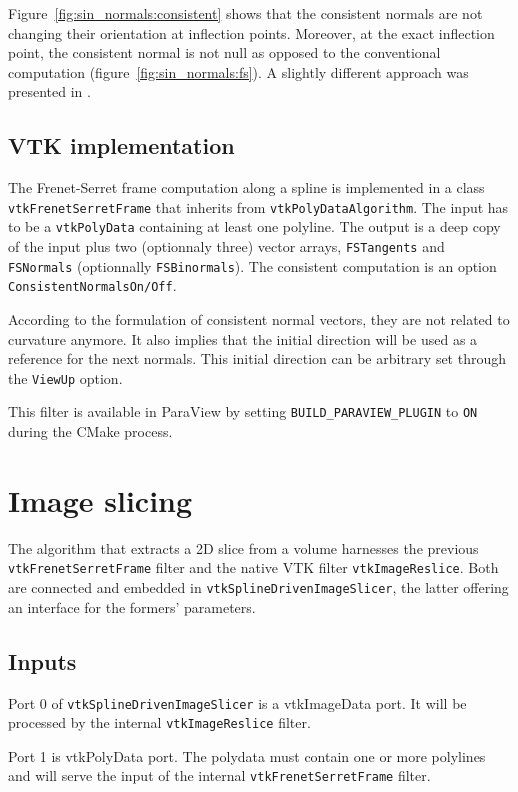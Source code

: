 \documentclass{InsightArticle}
\begin{document}
Figure~\ref{fig:sin_normals:consistent} shows that the consistent normals are
not changing their orientation at inflection points. Moreover, at the exact
inflection point, the consistent normal is not null as opposed to the 
conventional computation (figure~\ref{fig:sin_normals:fs}). A slightly 
different approach was presented in \cite{KLO86.1}.
%
\subsection{VTK implementation}
%
The Frenet-Serret frame computation along a spline is implemented in a class
\verb!vtkFrenetSerretFrame! that inherits from \verb!vtkPolyDataAlgorithm!.
The input has to be a \verb!vtkPolyData! containing at least one polyline. The 
output is a deep copy of the input plus two (optionnaly three) vector arrays, 
\verb!FSTangents! and \verb!FSNormals! (optionnally \verb!FSBinormals!). The
consistent computation is an option \verb!ConsistentNormalsOn/Off!.

According to the formulation of consistent normal vectors, they are not related
to curvature anymore. It also implies that the initial direction will be used
as a reference for the next normals. This initial direction can be arbitrary
set through the \verb!ViewUp! option.

This filter is available in ParaView by setting \verb!BUILD_PARAVIEW_PLUGIN! to
\verb!ON! during the CMake process.
%
\section{Image slicing}
%
The algorithm that extracts a 2D slice from a volume harnesses the previous
\verb!vtkFrenetSerretFrame! filter and the native VTK filter 
\verb!vtkImageReslice!. Both are connected and embedded in 
\verb!vtkSplineDrivenImageSlicer!, the latter offering an interface for the
formers' parameters.
%
\subsection{Inputs}
%
Port 0 of \verb!vtkSplineDrivenImageSlicer! is a vtkImageData port. It will be
processed by the internal \verb!vtkImageReslice! filter.

Port 1 is vtkPolyData port. The polydata must contain one or more polylines and
will serve the input of the internal \verb!vtkFrenetSerretFrame! filter.
%
\end{document}
